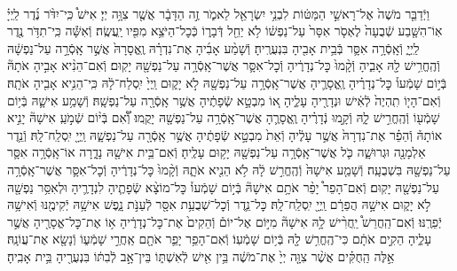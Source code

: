 \documentclass[twoside, openany, parskip=half, 11pt]{book}
\begin{document}
\begin{footnotesize}
\begin{multicols}{2}
\\
וַיְֿדַבֵּ֤ר מֹשֶׁה֙ אֶל־רָאשֵׁ֣י הַמַּטּ֔וֹת לִבְנֵ֥י יִשְׂרָאֵ֖ל לֵאמֹ֑ר זֶ֣ה הַדָּבָ֔ר אֲשֶׁ֖ר צִוָּ֥ה יְיָ׃ אִישׁ֩ כִּֽי־יִדֹּ֨ר נֶ֜דֶר לַֽיְיָ֗ אֽוֹ־הִשָּׁ֤בַע שְֿׁבֻעָה֙ לֶאְסֹ֤ר אִסָּר֙ עַל־נַפְשׁ֔וֹ לֹ֥א יַחֵ֖ל דְּֿבָר֑וֹ כְּֿכׇל־הַיֹּצֵ֥א מִפִּ֖יו יַֽעֲשֶֽׂה׃ וְֿאִשָּׁ֕ה כִּֽי־תִדֹּ֥ר נֶ֖דֶר לַֽיְיָ֑ וְֿאָֽסְֿרָ֥ה אִסָּ֛ר בְּֿבֵ֥ית אָבִ֖יהָ בִּנְעֻרֶֽיהָ׃ וְֿשָׁמַ֨ע אָבִ֜יהָ אֶת־נִדְרָ֗הּ וֶֽאֱסָרָהּ֙ אֲשֶׁ֣ר אָֽסְֿרָ֣ה עַל־נַפְשָׁ֔הּ וְֿהֶֽחֱרִ֥ישׁ לָ֖הּ אָבִ֑יהָ וְֿקָ֨מוּ֙ כׇּל־נְדָרֶ֔יהָ וְֿכׇל־אִסָּ֛ר אֲשֶׁר־אָֽסְֿרָ֥ה עַל־נַפְשָׁ֖הּ יָקֽוּם׃ וְֿאִם־הֵנִ֨יא אָבִ֣יהָ אֹתָהּ֘ בְּֿי֣וֹם שָׁמְֿעוֹ֒ כׇּל־נְדָרֶ֗יהָ וֶֽאֱסָרֶ֛יהָ אֲשֶׁר־אָֽסְֿרָ֥ה עַל־נַפְשָׁ֖הּ לֹ֣א יָק֑וּם וַֽיְיָ֙ יִֽסְלַח־לָ֔הּ כִּֽי־הֵנִ֥יא אָבִ֖יהָ אֹתָֽהּ׃ וְֿאִם־הָי֤וֹ תִֽהְיֶה֙ לְֿאִ֔ישׁ וּנְדָרֶ֖יהָ עָלֶ֑יהָ א֚וֹ מִבְטָ֣א שְֿׂפָתֶ֔יהָ אֲשֶׁ֥ר אָֽסְֿרָ֖ה עַל־נַפְשָֽׁהּ׃ וְֿשָׁמַ֥ע אִישָׁ֛הּ בְּֿי֥וֹם שָׁמְֿע֖וֹ וְֿהֶֽחֱרִ֣ישׁ לָ֑הּ וְֿקָ֣מוּ נְֿדָרֶ֗יהָ וֶֽאֱסָרֶ֛הָ אֲשֶׁר־אָֽסְֿרָ֥ה עַל־נַפְשָׁ֖הּ יָקֻֽמוּ׃ וְֿ֠אִ֠ם בְּֿי֨וֹם שְֿׁמֹ֣עַֽ אִישָׁהּ֘ יָנִ֣יא אוֹתָהּ֒ וְֿהֵפֵ֗ר אֶת־נִדְרָהּ֙ אֲשֶׁ֣ר עָלֶ֔יהָ וְֿאֵת֙ מִבְטָ֣א שְֿׂפָתֶ֔יהָ אֲשֶׁ֥ר אָֽסְֿרָ֖ה עַל־נַפְשָׁ֑הּ וַֽיְיָ֖ יִֽסְלַֽח־לָֽהּ׃  וְֿנֵ֥דֶר אַלְמָנָ֖ה וּגְרוּשָׁ֑ה כֹּ֛ל אֲשֶׁר־אָֽסְֿרָ֥ה עַל־נַפְשָׁ֖הּ יָק֥וּם עָלֶֽיהָ׃ וְֿאִם־בֵּ֥ית אִישָׁ֖הּ נָדָ֑רָה אוֹ־אָֽסְֿרָ֥ה אִסָּ֛ר עַל־נַפְשָׁ֖הּ בִּשְׁבֻעָֽה׃ וְֿשָׁמַ֤ע אִישָׁהּ֙ וְֿהֶֽחֱרִ֣שׁ לָ֔הּ לֹ֥א הֵנִ֖יא אֹתָ֑הּ וְֿקָ֨מוּ֙ כׇּל־נְדָרֶ֔יהָ וְֿכׇל־אִסָּ֛ר אֲשֶׁר־אָֽסְֿרָ֥ה עַל־נַפְשָׁ֖הּ יָקֽוּם׃ וְֿאִם־הָפֵר֩ יָפֵ֨ר אֹתָ֥ם אִישָׁהּ֘ בְּֿי֣וֹם שָׁמְֿעוֹ֒ כׇּל־מוֹצָ֨א שְֿׂפָתֶ֧יהָ לִנְדָרֶ֛יהָ וּלְאִסַּ֥ר נַפְשָׁ֖הּ לֹ֣א יָק֑וּם אִישָׁ֣הּ הֲפֵרָ֔ם וַֽיְיָ֖ יִֽסְלַֽח־לָֽהּ׃  כׇּל־נֵ֛דֶר וְֿכׇל־שְׁבֻעַ֥ת אִסָּ֖ר לְֿעַנֹּ֣ת נָ֑פֶשׁ אִישָׁ֥הּ יְֿקִימֶ֖נּוּ וְֿאִישָׁ֥הּ יְֿפֵרֶֽנּוּ׃ וְֿאִם־הַֽחֲרֵשׁ֩ יַֽחֲרִ֨ישׁ לָ֥הּ אִישָׁהּ֘ מִיּ֣וֹם אֶל־יוֹם֒ וְֿהֵקִים֙ אֶת־כׇּל־נְדָרֶ֔יהָ א֥וֹ אֶת־כׇּל־אֱסָרֶ֖יהָ אֲשֶׁ֣ר עָלֶ֑יהָ הֵקִ֣ים אֹתָ֔ם כִּי־הֶֽחֱרִ֥שׁ לָ֖הּ בְּֿי֥וֹם שָׁמְֿעֽוֹ׃ וְֿאִם־הָפֵ֥ר יָפֵ֛ר אֹתָ֖ם אַֽחֲרֵ֣י שָׁמְֿע֑וֹ וְֿנָשָׂ֖א אֶת־עֲוֹנָֽהּ׃ אֵ֣לֶּה הַֽחֻקִּ֗ים אֲשֶׁ֨ר צִוָּ֤ה יְיָ֙ אֶת־מֹשֶׁ֔ה בֵּ֥ין אִ֖ישׁ לְֿאִשְׁתּ֑וֹ בֵּין־אָ֣ב לְֿבִתּ֔וֹ בִּנְעֻרֶ֖יהָ בֵּ֥ית אָבִֽיהָ׃


\end{multicols}
\end{footnotesize}
\end{document}
